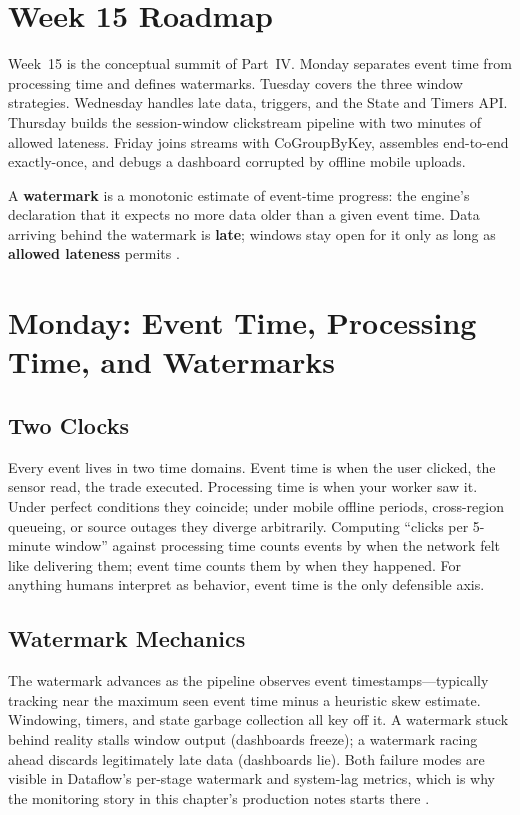 \section{Week 15 Roadmap}
Week~15 is the conceptual summit of Part~IV. Monday separates event time from processing time and defines watermarks. Tuesday covers the three window strategies. Wednesday handles late data, triggers, and the State and Timers API. Thursday builds the session-window clickstream pipeline with two minutes of allowed lateness. Friday joins streams with CoGroupByKey, assembles end-to-end exactly-once, and debugs a dashboard corrupted by offline mobile uploads.

\begin{definitionbox}
A \textbf{watermark} is a monotonic estimate of event-time progress: the engine's declaration that it expects no more data older than a given event time. Data arriving behind the watermark is \textbf{late}; windows stay open for it only as long as \textbf{allowed lateness} permits \cite{akidau2015dataflow,apachebeamdocs}.
\end{definitionbox}

\section{Monday: Event Time, Processing Time, and Watermarks}

\subsection{Two Clocks}
Every event lives in two time domains. Event time is when the user clicked, the sensor read, the trade executed. Processing time is when your worker saw it. Under perfect conditions they coincide; under mobile offline periods, cross-region queueing, or source outages they diverge arbitrarily. Computing ``clicks per 5-minute window'' against processing time counts events by when the network felt like delivering them; event time counts them by when they happened. For anything humans interpret as behavior, event time is the only defensible axis.

\subsection{Watermark Mechanics}
The watermark advances as the pipeline observes event timestamps---typically tracking near the maximum seen event time minus a heuristic skew estimate. Windowing, timers, and state garbage collection all key off it. A watermark stuck behind reality stalls window output (dashboards freeze); a watermark racing ahead discards legitimately late data (dashboards lie). Both failure modes are visible in Dataflow's per-stage watermark and system-lag metrics, which is why the monitoring story in this chapter's production notes starts there \cite{googleclouddataflowdocs}.

